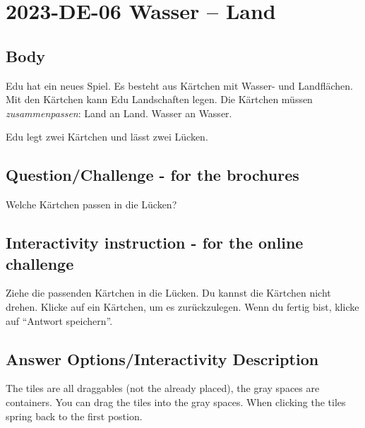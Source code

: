 \documentclass[a4paper,11pt]{report}
\newcommand{\taskGraphicsFolder}{..}
\begin{document}
\section*{\centering{} 2023-DE-06 Wasser – Land}


\subsection*{Body}

Edu hat ein neues Spiel. Es besteht aus Kärtchen mit Wasser- und Landflächen.
Mit den Kärtchen kann Edu Landschaften legen. Die Kärtchen müssen \emph{zusammenpassen}: Land an Land. Wasser an Wasser.

{\centering%
\raisebox{-0.5ex}{}
\raisebox{-0.5ex}{}\par}

Edu legt zwei Kärtchen und lässt zwei Lücken.

{\em


\subsection*{Question/Challenge - for the brochures}

Welche Kärtchen passen in die Lücken?

{\centering%
\par}

}


\subsection*{Interactivity instruction - for the online challenge}

Ziehe die passenden Kärtchen in die Lücken. Du kannst die Kärtchen nicht drehen. Klicke auf ein Kärtchen, um es zurückzulegen. Wenn du fertig bist, klicke auf \enquote{Antwort speichern}.

\begingroup
\renewcommand{\arraystretch}{1.5}
\subsection*{Answer Options/Interactivity Description}

The tiles are all draggables (not the already placed), the gray spaces are containers. You can drag the tiles into the gray spaces. When clicking the tiles spring back to the first postion.
\end{document}
